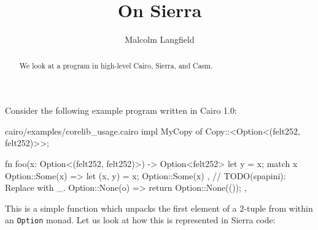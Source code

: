\documentclass[10pt]{amsart}
\begin{document}
\title{On Sierra}
\author{Malcolm Langfield}
\begin{abstract}
  We look at a program in high-level Cairo, Sierra, and Casm.
\end{abstract}

\maketitle

Consider the following example program written in Cairo 1.0:
\vspace{1em}
\begin{code}{cairo/examples/corelib\_usage.cairo}
impl MyCopy of Copy::<Option<(felt252, felt252)>>;

fn foo(x: Option<(felt252, felt252)>) -> Option<felt252> {
    let y = x;
    match x {
        Option::Some(x) => {
            let (x, y) = x;
            Option::Some(x)
        },
        // TODO(spapini): Replace with _.
        Option::None(o) => {
            return Option::None(());
        },
    }
}
\end{code}
This is a simple function which unpacks the first element of a $2$-tuple from within an \texttt{Option} monad. Let us look at how this is represented in Sierra code:
\end{document}
